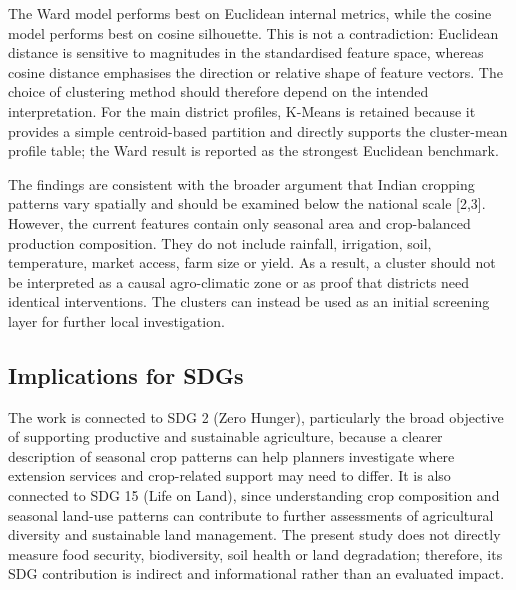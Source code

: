 \documentclass[9pt,a4paper,twocolumn]{extarticle}
\begin{document}
The Ward model performs best on Euclidean internal metrics, while the cosine model performs best on cosine silhouette. This is not a contradiction: Euclidean distance is sensitive to magnitudes in the standardised feature space, whereas cosine distance emphasises the direction or relative shape of feature vectors. The choice of clustering method should therefore depend on the intended interpretation. For the main district profiles, K-Means is retained because it provides a simple centroid-based partition and directly supports the cluster-mean profile table; the Ward result is reported as the strongest Euclidean benchmark.

The findings are consistent with the broader argument that Indian cropping patterns vary spatially and should be examined below the national scale [2,3]. However, the current features contain only seasonal area and crop-balanced production composition. They do not include rainfall, irrigation, soil, temperature, market access, farm size or yield. As a result, a cluster should not be interpreted as a causal agro-climatic zone or as proof that districts need identical interventions. The clusters can instead be used as an initial screening layer for further local investigation.

\subsection{Implications for SDGs}
The work is connected to SDG 2 (Zero Hunger), particularly the broad objective of supporting productive and sustainable agriculture, because a clearer description of seasonal crop patterns can help planners investigate where extension services and crop-related support may need to differ. It is also connected to SDG 15 (Life on Land), since understanding crop composition and seasonal land-use patterns can contribute to further assessments of agricultural diversity and sustainable land management. The present study does not directly measure food security, biodiversity, soil health or land degradation; therefore, its SDG contribution is indirect and informational rather than an evaluated impact.
\end{document}
